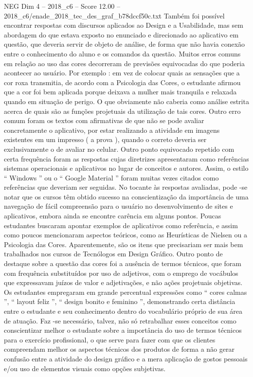 \begin{textsample}{NEG Dim 4 – 2018\_c6 – Score 12.00 – 2018\_c6/enade\_2018\_tec\_des\_graf\_b78dccf50c.txt}
Também foi possível encontrar respostas com discursos aplicados ao Design e a Usabilidade, mas sem abordagem do que estava exposto no enunciado e direcionado ao aplicativo em questão, que deveria servir de objeto de análise, de forma que não havia conexão entre o conhecimento do aluno e os comandos da questão.
Muitos erros comuns em relação ao uso das cores decorreram de previsões equivocadas do que poderia acontecer ao usuário.
Por exemplo : em vez de colocar quais as sensações que a cor roxa transmitia, de acordo com a Psicologia das Cores, o estudante afirmou que a cor foi bem aplicada porque deixava a mulher mais tranquila e relaxada quando em situação de perigo.
O que obviamente não caberia como análise estrita acerca de quais são as funções projetuais da utilização de tais cores.
Outro erro comum foram os textos com afirmativas de que não se pode avaliar concretamente o aplicativo, por estar realizando a atividade em imagens existentes em um impresso ( a prova ), quando o correto deveria ser exclusivamente o de avaliar no celular.
Outro ponto equivocado repetido com certa frequência foram as respostas cujas diretrizes apresentaram como referências sistemas operacionais e aplicativos no lugar de conceitos e autores.
Assim, o estilo “ Windows ” ou o “ Google Material ” foram muitas vezes citados como referências que deveriam ser seguidas.
No tocante às respostas avaliadas, pode -se notar que os cursos têm obtido sucesso na conscientização da importância de uma navegação de fácil compreensão para o usuário no desenvolvimento de sites e aplicativos, embora ainda se encontre carência em alguns pontos.
Poucas estudantes buscaram apontar exemplos de aplicativos como referência, e assim como poucos mencionaram aspectos teóricos, como as Heurísticas de Nielsen ou a Psicologia das Cores.
Aparentemente, são os itens que precisariam ser mais bem trabalhados nos cursos de Tecnólogos em Design Gráfico.
Outro ponto de destaque sobre a questão das cores foi a ausência de termos técnicos, que foram com frequência substituídos por uso de adjetivos, com o emprego de vocábulos que expressavam juízos de valor e adjetivações, e não ações projetuais objetivas.
Os estudantes empregaram em grande percentual expressões como “ cores calmas ”, “ layout feliz ”, “ design bonito e feminino ”, demonstrando certa distância entre o estudante e seu conhecimento dentro do vocabulário próprio de sua área de atuação.
Faz -se necessário, talvez, não só retrabalhar esses conceitos como conscientizar melhor o estudante sobre a importância do uso de termos técnicos para o exercício profissional, o que serve para fazer com que os clientes compreendam melhor os aspectos técnicos dos produtos de forma a não gerar confusão entre a atividade do design gráfico e a mera aplicação de gostos pessoais e/ou uso de elementos visuais como opções subjetivas.

\end{textsample}

